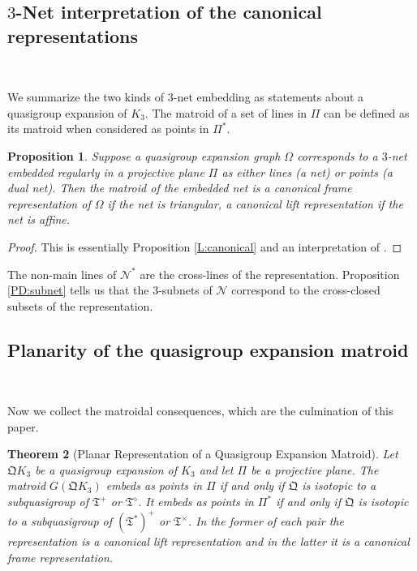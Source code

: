 \documentclass[reqno,12pt]{amsart}
\newcommand \comment[1]{}				%
\newtheorem{thm}{Theorem}[section]
\newtheorem{prop}[thm]{Proposition}
\theoremstyle{remark}
\numberwithin{equation}{section}
\numberwithin{figure}{section}
\newcommand \cN{\mathcal{N}}
\newcommand \fQ{\mathfrak Q}
\newcommand \fT{\mathfrak T}
\newcommand\PP{\Pi}	%
\begin{document}
\subsection{$3$-Net interpretation of the canonical representations}\label{netrep}\

We summarize the two kinds of $3$-net embedding as statements about a quasigroup expansion of $K_3$.  The matroid of a set of lines in $\PP$ can be defined as its matroid when considered as points in $\PP^*$.

\begin{prop}  \label{PD:netrep}
Suppose a quasigroup expansion graph $\Omega$ corresponds to a $3$-net embedded regularly in a projective plane $\PP$ as either lines (a net) or points (a dual net).  Then the matroid of the embedded net is a canonical frame representation of $\Omega$ if the net is triangular, a canonical lift representation if the net is affine.
\end{prop}

\begin{proof}  
This is essentially Proposition \ref{L:canonical} and an interpretation of \cite[Theorems 2.1\comment{TD:men} and 3.1\comment{TD:orthorep}]{BG6}.
\end{proof}

The non-main lines of $\cN^*$ are the cross-lines of the representation.  
Proposition \ref{PD:subnet} tells us that the $3$-subnets of $\cN$ correspond to the cross-closed subsets of the representation.  


\subsection{Planarity of the quasigroup expansion matroid}\label{x planar}\

Now we collect the matroidal consequences, which are the culmination of this paper.

\begin{thm}[Planar Representation of a Quasigroup Expansion Matroid]\label{T:planar}
Let $\fQ K_3$ be a quasigroup expansion of $K_3$ and let $\PP$ be a projective plane.  The matroid $G(\fQ K_3)$ embeds as points in $\PP$ if and only if $\fQ$ is isotopic to a subquasigroup of $\fT^+$ or $\fT^\diamond$.  It embeds as points in $\PP^*$ if and only if $\fQ$ is isotopic to a subquasigroup of $(\fT^*)^+$ or $\fT^\times$.  In the former of each pair the representation is a canonical lift representation and in the latter it is a canonical frame representation.
\end{thm}
\end{document}
